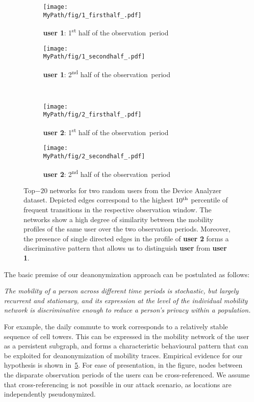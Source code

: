 \begin{figure}[!t]
	\centering
	\begin{subfigure}[]{0.495\textwidth}
		\centering		\texttt{[image: \\MyPath/fig/1\_firsthalf\_.pdf]}
		\caption{{\textbf{user 1}: 1\textsuperscript{st} half of the \mbox{observation period}}}
		\label{fig:evidence11}
	\end{subfigure}%
	\begin{subfigure}[]{0.495\textwidth}
		\centering
		\texttt{[image: \\MyPath/fig/1\_secondhalf\_.pdf]}
		\caption{{\textbf{user 1}: 2\textsuperscript{nd} half of the \mbox{observation period}}}
		\label{fig:evidence12}
	\end{subfigure}%
	\\
	\begin{subfigure}[]{0.495\textwidth}
		\centering
		\texttt{[image: \\MyPath/fig/2\_firsthalf\_.pdf]}
		\caption{{\textbf{user 2}: 1\textsuperscript{st} half of the \mbox{observation period}}}
		\label{fig:evidence21}
	\end{subfigure}
	\begin{subfigure}[]{0.495\textwidth}
		\centering
		\texttt{[image: \\MyPath/fig/2\_secondhalf\_.pdf]}
		\caption{{\textbf{user 2}: 2\textsuperscript{nd} half of the \mbox{observation period}}}
		\label{fig:evidence22}
	\end{subfigure}
	\caption{{Top$-20$ networks for two random users from the Device Analyzer dataset.
			Depicted edges correspond to the highest $10\textsuperscript{th}$ percentile of frequent transitions in the respective observation window. The networks show a high degree of similarity between the mobility profiles of the same user over the two observation periods. Moreover, the presence of single directed edges in the profile of \textbf{user 2} forms a discriminative pattern that allows us to distinguish \textbf{user} from \textbf{user 1}.}}
	\label{fig:evidence}
\end{figure}

The basic premise of our deanonymization approach can be postulated as follows:

\emph{
	The mobility of a person across different time periods is stochastic, but largely recurrent and stationary, and its expression at the level of the individual mobility network is discriminative enough to reduce a person's privacy within a population.}

For example, the daily commute to work corresponds to a relatively stable sequence of cell towers.
This can be expressed in the mobility network of the user as a persistent subgraph, and forms a characteristic behavioural pattern that can be exploited for deanonymization of mobility traces.
Empirical evidence for our hypothesis is shown in~\cref{fig:evidence}.
For ease of presentation, in the figure, nodes between the disparate observation periods of the users can be cross-referenced. We assume that cross-referencing is not possible in our attack scenario, as locations are independently pseudonymized.


